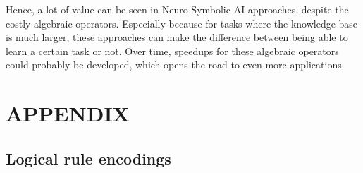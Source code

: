 \documentclass[english]{sobraep}
\begin{document}
Hence, a lot of value can be seen in Neuro Symbolic AI approaches, despite the costly algebraic operators. Especially because for tasks where the knowledge base is much larger, these approaches can make the difference between being able to learn a certain task or not. Over time, speedups for these algebraic operators could probably be developed, which opens the road to even more applications.


 

\section*{APPENDIX}
\subsection{Logical rule encodings}
\label{appendix:logical_rule_encodings}
\inputminted[breaklines]{prolog}{"/home/jorrit/Data/KU Leuven/Semester 12/Capita Selecta H05N0a/deepproblog/src/deepproblog/examples/SORTOFCLEVR/model.pl"}

\end{document}
